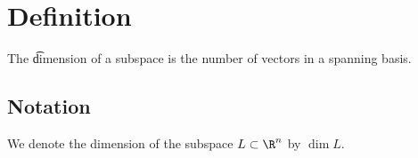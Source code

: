 

\section*{Definition}

The \t{dimension} of a subspace is the number of vectors in a spanning basis.

\subsection*{Notation}

We denote the dimension of the subspace $L \subset \R ^n$ by $\dim L$.

\blankpage